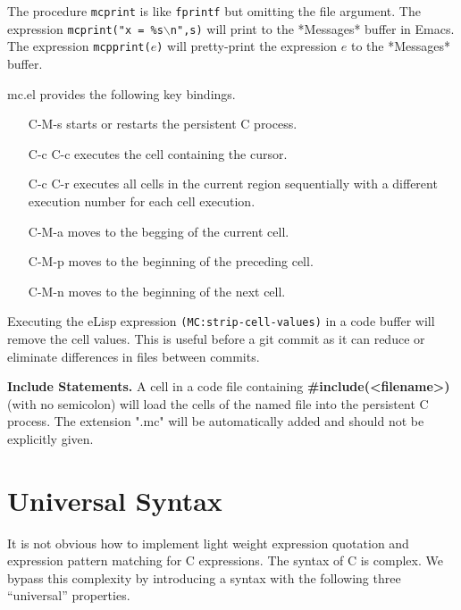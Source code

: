 \documentclass{article}
\begin{document}
 The procedure {\tt mcprint} is like {\tt fprintf} but omitting the file argument. The expression
{\tt mcprint("x = \%s$\backslash$n",s)} will print to the *Messages* buffer in Emacs. The expression {\tt mcpprint($e$)}
will pretty-print the expression $e$ to the *Messages* buffer.

  mc.el provides the following key bindings.

\begin{itemize}
\item[C-M-s] starts or restarts the persistent C process.

\item[C-c C-c] executes the cell containing the cursor.
  
\item[C-c C-r] executes all cells in the current region sequentially with a different execution number for each cell execution.

\item[C-M-a] moves to the begging of the current cell.

\item[C-M-p] moves to the beginning of the preceding cell.

\item[C-M-n] moves to the beginning of the next cell.

\end{itemize}

Executing the eLisp expression {\tt (MC:strip-cell-values)} in a code buffer will remove the cell values.  This is useful before a git commit as it can reduce or eliminate differences
in files between commits.

{\bf Include Statements.}  A cell in a code file containing {\bf \#include(<filename>)} (with no semicolon) will load the cells of the named
file into the persistent C process.  The extension ".mc" will be automatically added and should not be explicitly given.


\section{Universal Syntax}

It is not obvious how to implement light weight expression quotation and expression pattern matching for C expressions.  The syntax of C is complex.
We bypass this complexity by introducing a syntax with the following three ``universal'' properties.
\end{document}
